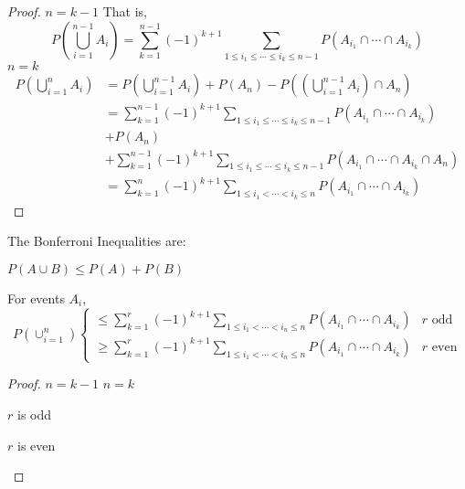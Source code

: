 \documentclass[../Main.tex]{subfiles}
\begin{document}
\begin{proof}
    {$n = k - 1$}{
        That is,
        \begin{equation*}
            P\left(\bigcup_{i=1}^{n-1} A_i\right) =\sum_{k=1}^{n-1} (-1)^{k+1} \sum_{1 \leq i_1 \leq \cdots \leq i_k \leq n-1} P(A_{i_1} \cap \cdots \cap A_{i_k})
        \end{equation*}
    }
    {$n = k$}{
        \begin{align*}
            P\left(\bigcup_{i=1}^n A_i\right) &= P\left(\bigcup_{i=1}^{n-1} A_i\right) + P(A_n) - P\left(\left(\bigcup_{i=1}^{n-1} A_i\right) \cap A_n\right) \\
            &= \sum_{k=1}^{n-1} (-1)^{k+1} \sum_{1 \leq i_1 \leq \cdots \leq i_k \leq n-1} P(A_{i_1} \cap \cdots \cap A_{i_k}) \\
            &+ P(A_n) \\
            &+ \sum_{k=1}^{n-1} (-1)^{k+1} \sum_{1 \leq i_1 \leq \cdots \leq i_k \leq n-1} P(A_{i_1} \cap \cdots \cap A_{i_k} \cap A_n) \\
            &= \sum_{k=1}^{n} (-1)^{k+1} \sum_{1 \leq i_1 < \cdots < i_k \leq n} P(A_{i_1} \cap \cdots \cap A_{i_k})
        \end{align*}
    }
\end{proof}
\begin{propositions}{
        The Bonferroni Inequalities are:
        \label{propsBonferroni}
    }
    \item $P(A \cup B) \leq P(A) + P(B)$
    \item For events $A_i$,
        \begin{equation*}
            P\left(\cup_{i = 1}^n\right)
            \begin{cases}
                \leq \sum_{k=1}^r (-1)^{k+1} \sum_{1 \leq i_1 < \cdots < i_n \leq n} P(A_{i_1} \cap \cdots \cap A_{i_k}) & r \text{ odd} \\
                \geq \sum_{k=1}^r (-1)^{k+1} \sum_{1 \leq i_1 < \cdots < i_n \leq n} P(A_{i_1} \cap \cdots \cap A_{i_k}) & r \text{ even}
            \end{cases}
        \end{equation*}
\end{propositions}
\begin{proof}
    {$n = k - 1$}{}
    {$n = k$}{
        \begin{case}{$r$ is odd}
        \end{case}
        \begin{case}{$r$ is even}
        \end{case}
    }
\end{proof}
\end{document}

